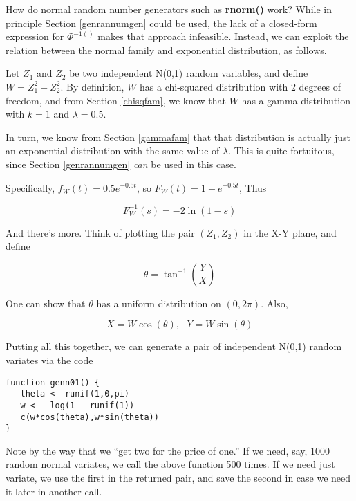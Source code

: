 How do normal random number generators such as {\bf rnorm()} work?
While in principle Section \ref{genrannumgen} could be used, the lack of
a closed-form expression for $\Phi^{-1()}$ makes that approach
infeasible.  Instead, we can exploit the relation between the normal
family and exponential distribution, as follows.

Let $Z_1$ and $Z_2$ be two independent N(0,1) random variables, and define
$W = Z_1^2 + Z_2^2$.  By definition, $W$ has a chi-squared distribution with
2 degrees of freedom, and from Section \ref{chisqfam}, we know that $W$
has a gamma distribution with $k = 1$ and $\lambda = 0.5$.

In turn, we know from Section \ref{gammafam} that that distribution is
actually just an exponential distribution with the same value of
$\lambda$.  This is quite fortuitous, since Section \ref{genrannumgen}
{\it can} be used in this case.

Specifically, $f_W(t) = 0.5 e^{-0.5t}$, so $F_W(t) = 1 - e^{-0.5t}$,
Thus

\begin{equation}
F_W^{-1}(s) = -2 \ln(1-s)
\end{equation}

And there's more.  Think of plotting the pair $(Z_1,Z_2)$ in the X-Y
plane, and define

\begin{equation}
\theta = \tan^{-1}(\frac{Y}{X})
\end{equation}

One can show that $\theta$ has a uniform distribution on
$(0,2\pi)$.  Also, 

\begin{equation}
X = W\cos(\theta), ~~~ Y = W\sin(\theta)
\end{equation}

Putting all this together, we can generate a pair of independent N(0,1)
random variates via the code

\begin{lstlisting}
function genn01() {
   theta <- runif(1,0,pi)
   w <- -log(1 - runif(1))
   c(w*cos(theta),w*sin(theta))
}
\end{lstlisting}

Note by the way that we ``get two for the price of one.''  If we need,
say, 1000 random normal variates, we call the above function 500 times.
If we need just variate, we use the first in the returned pair, and save
the second in case we need it later in another call.

